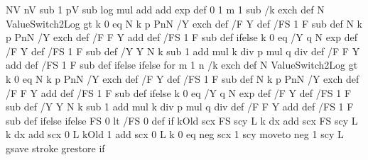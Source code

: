 {{{                              NV nV sub 1 pV sub log mul add add
                              exp
                             } def
                               0 1 m 1 sub {
                                                        /k exch def       %
                                                       N ValueSwitch2Log gt {  k 0 eq
                                                                                     { N k p PnN /Y exch def /F Y def /FS 1 F sub def }
                                                                                     { N k p PnN /Y exch def /F F Y add def /FS 1 F sub def }
                                                                          ifelse }
                                                                     { k 0 eq
                                                                     { /Y q N exp def
                                                                      /F Y def /FS 1 F sub def }
                                                                     { /Y Y N k sub 1 add mul k div p mul q div def
                                                                      /F F Y add def /FS 1 F sub def }
                                                                   ifelse } ifelse
                                                   } for
        m 1 n {             %
                     /k exch def       %
                     N ValueSwitch2Log gt { k 0 eq
                                                    { N k p PnN /Y exch def /F Y def /FS 1 F sub def }
                                                    { N k p PnN /Y exch def /F F Y add def /FS 1 F sub def } ifelse }
                     {  k 0 eq
                                     { /Y q N exp def
                                      /F Y def /FS 1 F sub def }
                                     { /Y Y N k sub 1 add mul k div p mul q div def
                                     /F F Y add def /FS 1 F sub def }
                                  ifelse
                      } ifelse  %
                       FS 0 lt { /FS 0 def } if
      \ifPst@markZeros kOld scx FS scy L k dx add scx FS scy L k dx add scx 0 L kOld 1 add scx 0 L
      \else
      \ifPst@LineEnding
      k 0 eq
        { \psFunc@leftEnd neg scx 1 scy moveto \psFunc@radiusout neg 1 scy L gsave \pst@usecolor\pslinecolor stroke grestore } if
}}}
